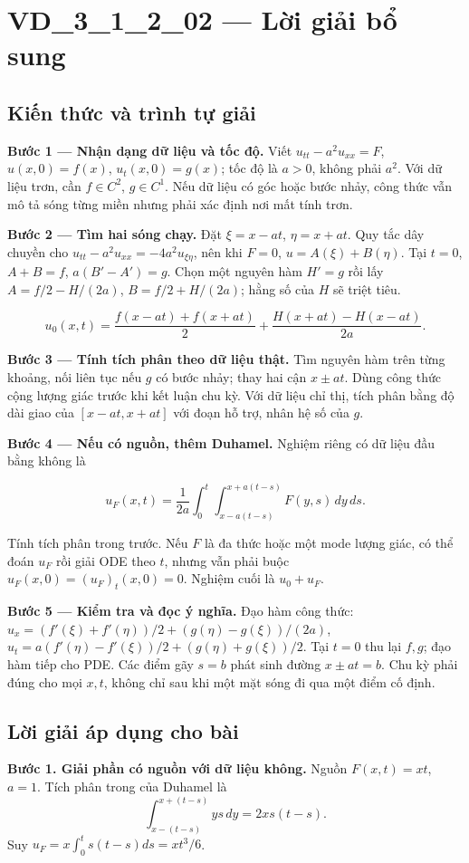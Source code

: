 \documentclass[10pt,a4paper]{article}
\begin{document}
\section*{VD\_3\_1\_2\_02 — Lời giải bổ sung}
\subsection*{Kiến thức và trình tự giải}
\textbf{Bước 1 — Nhận dạng dữ liệu và tốc độ.} Viết $u_{tt}-a^2u_{xx}=F$, $u(x,0)=f(x)$, $u_t(x,0)=g(x)$; tốc độ là $a>0$, không phải $a^2$. Với dữ liệu trơn, cần $f\in C^2$, $g\in C^1$. Nếu dữ liệu có góc hoặc bước nhảy, công thức vẫn mô tả sóng từng miền nhưng phải xác định nơi mất tính trơn.

\textbf{Bước 2 — Tìm hai sóng chạy.} Đặt $\xi=x-at$, $\eta=x+at$. Quy tắc dây chuyền cho $u_{tt}-a^2u_{xx}=-4a^2u_{\xi\eta}$, nên khi $F=0$, $u=A(\xi)+B(\eta)$. Tại $t=0$, $A+B=f$, $a(B'-A')=g$. Chọn một nguyên hàm $H'=g$ rồi lấy $A=f/2-H/(2a)$, $B=f/2+H/(2a)$; hằng số của $H$ sẽ triệt tiêu.


\[
u_0(x,t)=\frac{f(x-at)+f(x+at)}2+\frac{H(x+at)-H(x-at)}{2a}.
\]


\textbf{Bước 3 — Tính tích phân theo dữ liệu thật.} Tìm nguyên hàm trên từng khoảng, nối liên tục nếu $g$ có bước nhảy; thay hai cận $x\pm at$. Dùng công thức cộng lượng giác trước khi kết luận chu kỳ. Với dữ liệu chỉ thị, tích phân bằng độ dài giao của $[x-at,x+at]$ với đoạn hỗ trợ, nhân hệ số của $g$.

\textbf{Bước 4 — Nếu có nguồn, thêm Duhamel.} Nghiệm riêng có dữ liệu đầu bằng không là


\[
u_F(x,t)=\frac1{2a}\int_0^t\int_{x-a(t-s)}^{x+a(t-s)}F(y,s)\,dy\,ds.
\]


Tính tích phân trong trước. Nếu $F$ là đa thức hoặc một mode lượng giác, có thể đoán $u_F$ rồi giải ODE theo $t$, nhưng vẫn phải buộc $u_F(x,0)=(u_F)_t(x,0)=0$. Nghiệm cuối là $u_0+u_F$.

\textbf{Bước 5 — Kiểm tra và đọc ý nghĩa.} Đạo hàm công thức: $u_x=(f'(\xi)+f'(\eta))/2+(g(\eta)-g(\xi))/(2a)$, $u_t=a(f'(\eta)-f'(\xi))/2+(g(\eta)+g(\xi))/2$. Tại $t=0$ thu lại $f,g$; đạo hàm tiếp cho PDE. Các điểm gãy $s=b$ phát sinh đường $x\pm at=b$. Chu kỳ phải đúng cho mọi $x,t$, không chỉ sau khi một mặt sóng đi qua một điểm cố định.
\subsection*{Lời giải áp dụng cho bài}
\textbf{Bước 1. Giải phần có nguồn với dữ liệu không.} Nguồn $F(x,t)=xt$, $a=1$. Tích phân trong của Duhamel là
\[\int_{x-(t-s)}^{x+(t-s)}ys\,dy=2xs(t-s).\]
Suy $u_F=x\int_0^t s(t-s)ds=xt^3/6$.
\end{document}
